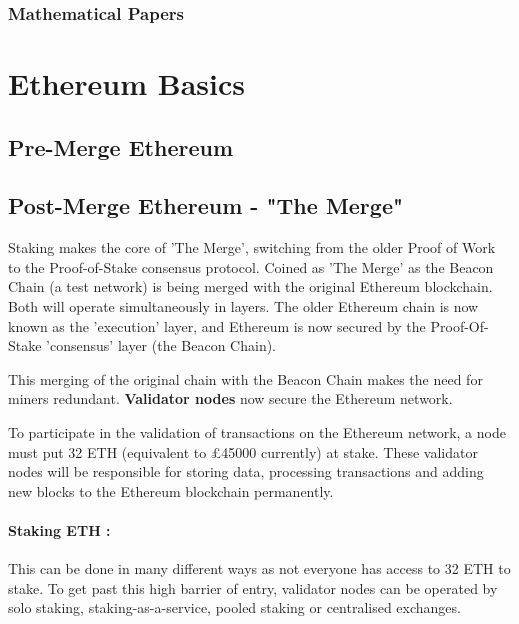 
\subsubsection{Mathematical Papers}



\section{Ethereum Basics}



\subsection{Pre-Merge Ethereum}

\subsection{Post-Merge Ethereum - "The Merge"}

Staking makes the core of 'The Merge', switching from the older Proof of Work to the Proof-of-Stake consensus protocol. Coined as 'The Merge' as the Beacon Chain (a test network) is being merged with the original Ethereum blockchain. Both will operate simultaneously in layers. The older Ethereum chain is now known as the 'execution' layer, and Ethereum is now secured by the Proof-Of-Stake 'consensus' layer (the Beacon Chain). 

This merging of the original chain with the Beacon Chain makes the need for miners redundant. \textbf{Validator nodes} now secure the Ethereum network. 

To participate in the validation of transactions on the Ethereum network, a node must put 32 ETH (equivalent to £45000 currently) at stake. These validator nodes will be responsible for storing data, processing transactions and adding new blocks to the Ethereum blockchain permanently. 

\paragraph{Staking ETH :}
This can be done in many different ways as not everyone has access to 32 ETH to stake. To get past this high barrier of entry, validator nodes can be operated by solo staking, staking-as-a-service, pooled staking or centralised exchanges.

